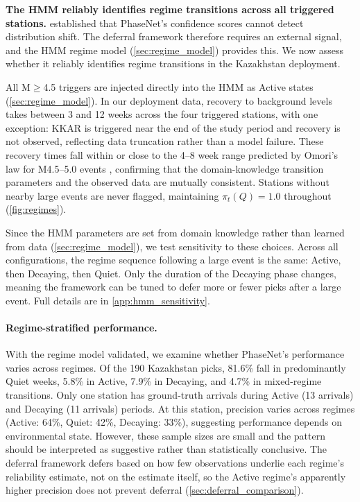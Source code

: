 \textbf{The HMM reliably identifies regime transitions across all triggered stations.}  established that PhaseNet's confidence scores cannot detect distribution shift. The deferral framework therefore requires an external signal, and the HMM regime model (\cref{sec:regime_model}) provides this. We now assess whether it reliably identifies regime transitions in the Kazakhstan deployment.

\medskip
All M$\geq$4.5 triggers are injected directly into the HMM as Active states (\cref{sec:regime_model}). In our deployment data, recovery to background levels takes between 3 and 12 weeks across the four triggered stations, with one exception: KKAR is triggered near the end of the study period and recovery is not observed, reflecting data truncation rather than a model failure. These recovery times fall within or close to the 4--8 week range predicted by Omori's law for M4.5--5.0 events \citep{utsu1995centenary}, confirming that the domain-knowledge transition parameters and the observed data are mutually consistent. Stations without nearby large events are never flagged, maintaining $\pi_t(Q) = 1.0$ 
throughout (\cref{fig:regimes}).

\medskip
Since the HMM parameters are set from domain knowledge rather than learned from data (\cref{sec:regime_model}), we test sensitivity to these choices. Across all configurations, the regime sequence following a large event is the same: Active, then Decaying, then Quiet. Only the duration of the Decaying phase changes, meaning the framework can be tuned to defer more or fewer picks after a large event. Full details are in \cref{app:hmm_sensitivity}.

\paragraph{Regime-stratified performance.} With the regime model validated, we examine whether PhaseNet's performance varies across regimes. Of the 190 Kazakhstan picks, 81.6\% fall in predominantly Quiet weeks, 5.8\% in Active, 7.9\% in Decaying, and 4.7\% in mixed-regime transitions. Only one station has ground-truth arrivals during Active (13 arrivals) and Decaying (11 arrivals) periods. At this station, precision varies across regimes (Active: 64\%, Quiet: 42\%, Decaying: 33\%), suggesting performance depends on environmental state. However, these sample sizes are small and the pattern should be interpreted as suggestive rather than statistically conclusive. The deferral framework defers based on how few observations underlie each regime's reliability estimate, not on the estimate itself, so the Active regime's apparently higher precision does not prevent deferral (\cref{sec:deferral_comparison}).

